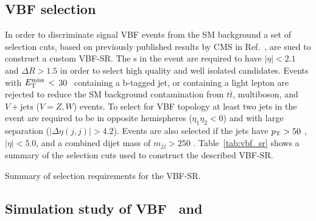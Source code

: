	 \subsection{VBF selection}
	  \label{subsec:vbfselection}
	  In order to discriminate signal \ac{VBF} events from the \ac{SM} background a set of selection cuts, based on previously published results by \ac{CMS} in Ref.~\cite{CMSVBFpaper}, are sued to construct a custom \ac{VBF}-\ac{SR}. 
	The \ltau s in the event are required to have $|\eta|<2.1$  and $\Delta R > 1.5$ in order to select high quality and well isolated candidates.
	Events with $E_{\mathrm{T}}^{\mathrm{miss}}\,<$ 30 \gev\, containing a b-tagged jet, or containing a light lepton are rejected to reduce the \ac{SM} background contamination from $t\bar{t}$, multiboson, and $V+\mathrm{jets}$ ($V=Z,W$) events. 
	To select for \ac{VBF} topology at least two jets in the event are required to be in opposite hemispheres ($\eta_1\eta_2<0$) and with large separation ($|\Delta\eta(j,j)|>4.2$). Events are also selected if the jets have $p_{\mathrm{T}}>50$ \gev, $|\eta|<5.0$, and a combined dijet mass of $m_{jj}>250$ \gev.
	Table~\ref{tab:vbf_sr} shows a summary of the selection cuts used to construct the described \ac{VBF}-\ac{SR}.
	\begin{table}[!hbt]
	\centering
	\caption{Summary of selection requirements for the \ac{VBF}-\ac{SR}.}
	
	\label{tab:vbf_sr}
	\end{table}	
	
	\subsection{Simulation study of VBF \chinoonepm\chinoonepm\ and \chinoonepm\ninotwo}
	 \label{subsec:vbf_sensitivity}
	 
